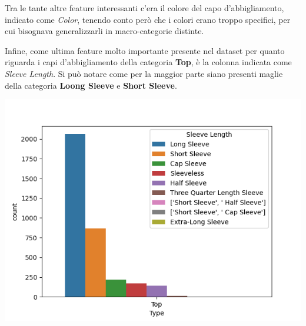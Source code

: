 \documentclass[a4paper, 11pt, oneside]{report}
\begin{document}
                \bigskip
                \par \noindent Tra le tante altre feature interessanti c'era il colore del capo d'abbigliamento, indicato
                come \textit{Color}, tenendo conto però che i colori erano troppo specifici, per cui bisognava
                generalizzarli in macro-categorie distinte.
                \\
                \par \noindent Infine, come ultima feature molto importante presente nel dataset per quanto riguarda i capi
                d'abbigliamento della categoria \textbf{Top}, è la colonna indicata come \textit{Sleeve Length}. Si può
                notare come per la maggior parte siano presenti maglie della categoria \textbf{Loong Sleeve} e
                \textbf{Short Sleeve}.
                \begin{center}
                    \includegraphics[scale=0.4]{countLengthTop}
                \end{center}
                \newpage
\end{document}
